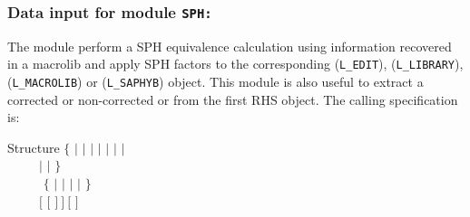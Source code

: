 \subsubsection{Data input for module {\tt SPH:}}

The  module perform a SPH equivalence calculation using
information recovered in a macrolib and apply SPH factors to the corresponding  ({\tt L\_EDIT}),
 ({\tt L\_LIBRARY}),  ({\tt L\_MACROLIB}) or  ({\tt L\_SAPHYB}) object. This module is also useful
to extract a corrected or non-corrected  or  from the first RHS object. The calling specification is:

\begin{DataStructure}{Structure }
$\{$  $|$  $|$  $|$  $|$  $|$  $|$  $|$  \\
~~~~~$|$  $|$  $\}$ \\
~~~~~\moc{:=}  $\{$  $|$ 
$|$  $|$  $|$  $\}$ \\
~~~~~$[$  $[$  $]~]~[$  $]$ \\
~~~~~\moc{::} 
\end{DataStructure}

